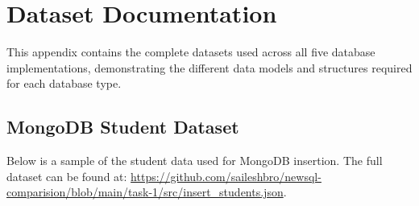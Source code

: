 \chapter{Dataset Documentation}

This appendix contains the complete datasets used across all five database implementations, demonstrating the different data models and structures required for each database type.

\section{MongoDB Student Dataset}

Below is a sample of the student data used for MongoDB insertion. The full dataset can be found at: \url{https://github.com/saileshbro/newsql-comparision/blob/main/task-1/src/insert_students.json}.


